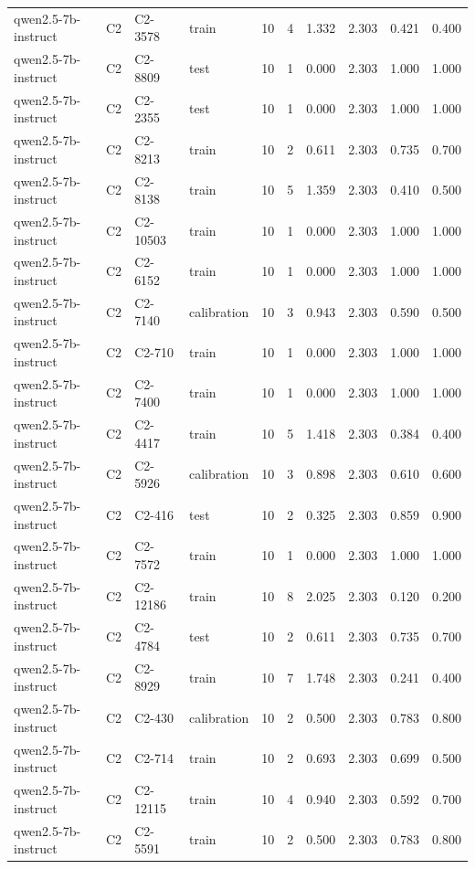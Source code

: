\begin{table}
\begin{tabular}{llllrrrrrr}
qwen2.5-7b-instruct & C2 & C2-3578 & train & 10 & 4 & 1.332 & 2.303 & 0.421 & 0.400 \\
qwen2.5-7b-instruct & C2 & C2-8809 & test & 10 & 1 & 0.000 & 2.303 & 1.000 & 1.000 \\
qwen2.5-7b-instruct & C2 & C2-2355 & test & 10 & 1 & 0.000 & 2.303 & 1.000 & 1.000 \\
qwen2.5-7b-instruct & C2 & C2-8213 & train & 10 & 2 & 0.611 & 2.303 & 0.735 & 0.700 \\
qwen2.5-7b-instruct & C2 & C2-8138 & train & 10 & 5 & 1.359 & 2.303 & 0.410 & 0.500 \\
qwen2.5-7b-instruct & C2 & C2-10503 & train & 10 & 1 & 0.000 & 2.303 & 1.000 & 1.000 \\
qwen2.5-7b-instruct & C2 & C2-6152 & train & 10 & 1 & 0.000 & 2.303 & 1.000 & 1.000 \\
qwen2.5-7b-instruct & C2 & C2-7140 & calibration & 10 & 3 & 0.943 & 2.303 & 0.590 & 0.500 \\
qwen2.5-7b-instruct & C2 & C2-710 & train & 10 & 1 & 0.000 & 2.303 & 1.000 & 1.000 \\
qwen2.5-7b-instruct & C2 & C2-7400 & train & 10 & 1 & 0.000 & 2.303 & 1.000 & 1.000 \\
qwen2.5-7b-instruct & C2 & C2-4417 & train & 10 & 5 & 1.418 & 2.303 & 0.384 & 0.400 \\
qwen2.5-7b-instruct & C2 & C2-5926 & calibration & 10 & 3 & 0.898 & 2.303 & 0.610 & 0.600 \\
qwen2.5-7b-instruct & C2 & C2-416 & test & 10 & 2 & 0.325 & 2.303 & 0.859 & 0.900 \\
qwen2.5-7b-instruct & C2 & C2-7572 & train & 10 & 1 & 0.000 & 2.303 & 1.000 & 1.000 \\
qwen2.5-7b-instruct & C2 & C2-12186 & train & 10 & 8 & 2.025 & 2.303 & 0.120 & 0.200 \\
qwen2.5-7b-instruct & C2 & C2-4784 & test & 10 & 2 & 0.611 & 2.303 & 0.735 & 0.700 \\
qwen2.5-7b-instruct & C2 & C2-8929 & train & 10 & 7 & 1.748 & 2.303 & 0.241 & 0.400 \\
qwen2.5-7b-instruct & C2 & C2-430 & calibration & 10 & 2 & 0.500 & 2.303 & 0.783 & 0.800 \\
qwen2.5-7b-instruct & C2 & C2-714 & train & 10 & 2 & 0.693 & 2.303 & 0.699 & 0.500 \\
qwen2.5-7b-instruct & C2 & C2-12115 & train & 10 & 4 & 0.940 & 2.303 & 0.592 & 0.700 \\
qwen2.5-7b-instruct & C2 & C2-5591 & train & 10 & 2 & 0.500 & 2.303 & 0.783 & 0.800 \\

\end{tabular}
\end{table}
